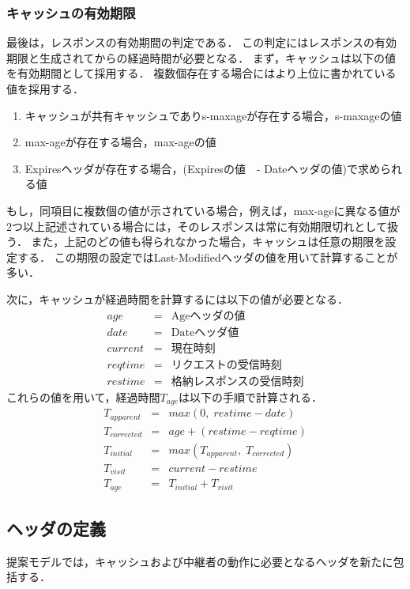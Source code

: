 \documentclass{css}
\begin{document}
\subsubsection{キャッシュの有効期限}
\label{sec:expiration}
最後は，レスポンスの有効期間の判定である．
この判定にはレスポンスの有効期限と生成されてからの経過時間が必要となる．
まず，キャッシュは以下の値を有効期間として採用する．
複数個存在する場合にはより上位に書かれている値を採用する．
\begin{enumerate}
\item キャッシュが共有キャッシュでありs-maxageが存在する場合，s-maxageの値
\item max-ageが存在する場合，max-ageの値
\item Expiresヘッダが存在する場合，(Expiresの値　- Dateヘッダの値)で求められる値
\end{enumerate}
もし，同項目に複数個の値が示されている場合，例えば，max-ageに異なる値が2つ以上記述されている場合には，そのレスポンスは常に有効期限切れとして扱う．
また，上記のどの値も得られなかった場合，キャッシュは任意の期限を設定する．
この期限の設定ではLast-Modifiedヘッダの値を用いて計算することが多い．

次に，キャッシュが経過時間を計算するには以下の値が必要となる．
\begin{eqnarray*}
age & = & \mbox{Ageヘッダの値}\\
date & = & \mbox{Dateヘッダ値}\\
current & = & \mbox{現在時刻}\\
reqtime & = & \mbox{リクエストの受信時刻}\\
restime & = & \mbox{格納レスポンスの受信時刻}
\end{eqnarray*}
これらの値を用いて，経過時間$T_{age}$は以下の手順で計算される．
\begin{eqnarray*}
T_{apparent} & = & max(0,\;restime - date)\\
T_{corrected} & = & age + (restime - reqtime)\\
T_{initial} & = & max(T_{apparent},\;T_{corrected})\\
T_{visit} & = & current - restime\\
T_{age} & = & T_{initial} + T_{visit}
\end{eqnarray*}

\subsection{ヘッダの定義}
提案モデルでは，キャッシュおよび中継者の動作に必要となるヘッダを新たに包括する．
\end{document}
